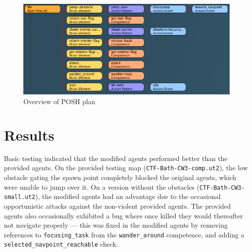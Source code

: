\documentclass[a4paper,12pt]{article}
\begin{document}
\begin{figure}[h!]
	\centering
	\includegraphics[width=\linewidth]{full}
	\caption{Overview of POSH plan}
	\label{fig:full}
\end{figure}

\section{Results}
Basic testing indicated that the modified agents performed better than the provided agents. On the provided testing map (\texttt{CTF-Bath-CW3-comp.ut2}), the low obstacle gating the spawn point completely blocked the original agents, which were unable to jump over it. On a version without the obstacles (\texttt{CTF-Bath-CW3-small.ut2}), the modified agents had an advantage due to the occasional opportunistic attacks against the non-violent provided agents. The provided agents also occasionally exhibited a bug where once killed they would thereafter not navigate properly --- this was fixed in the modified agents by removing references to \texttt{focusing\_task} from the \texttt{wander\_around} competence, and adding a \texttt{selected\_navpoint\_reachable} check.


\end{document}
